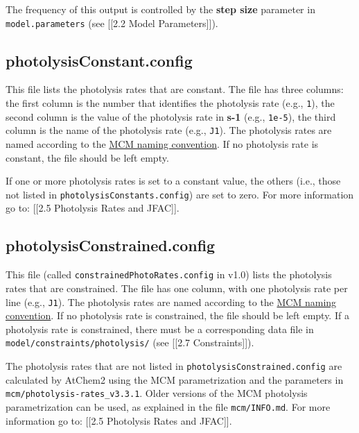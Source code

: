The frequency of this output is controlled by the \textbf{step size}
parameter in \texttt{model.parameters} (see {[}{[}2.2 Model
Parameters{]}{]}).

\subsection{photolysisConstant.config} \label{photolysisconstant.config}

This file lists the photolysis rates that are constant. The file has
three columns: the first column is the number that identifies the
photolysis rate (e.g., \texttt{1}), the second column is the value of
the photolysis rate in \textbf{s-1} (e.g., \texttt{1e-5}), the third
column is the name of the photolysis rate (e.g., \texttt{J1}). The
photolysis rates are named according to the
\href{http://mcm.leeds.ac.uk/MCMv3.3.1/parameters/photolysis.htt}{MCM
naming convention}. If no photolysis rate is constant, the file should
be left empty.

If one or more photolysis rates is set to a constant value, the others
(i.e., those not listed in \texttt{photolysisConstants.config}) are set
to zero. For more information go to: {[}{[}2.5 Photolysis Rates and
JFAC{]}{]}.

\subsection{photolysisConstrained.config} \label{photolysisconstrained.config}

This file (called \texttt{constrainedPhotoRates.config} in v1.0) lists
the photolysis rates that are constrained. The file has one column, with
one photolysis rate per line (e.g., \texttt{J1}). The photolysis rates
are named according to the
\href{http://mcm.leeds.ac.uk/MCMv3.3.1/parameters/photolysis.htt}{MCM
naming convention}. If no photolysis rate is constrained, the file
should be left empty. If a photolysis rate is constrained, there must be
a corresponding data file in \texttt{model/constraints/photolysis/} (see
{[}{[}2.7 Constraints{]}{]}).

The photolysis rates that are not listed in
\texttt{photolysisConstrained.config} are calculated by AtChem2 using
the MCM parametrization and the parameters in
\texttt{mcm/photolysis-rates\_v3.3.1}. Older versions of the MCM
photolysis parametrization can be used, as explained in the file
\texttt{mcm/INFO.md}. For more information go to: {[}{[}2.5 Photolysis
Rates and JFAC{]}{]}.

